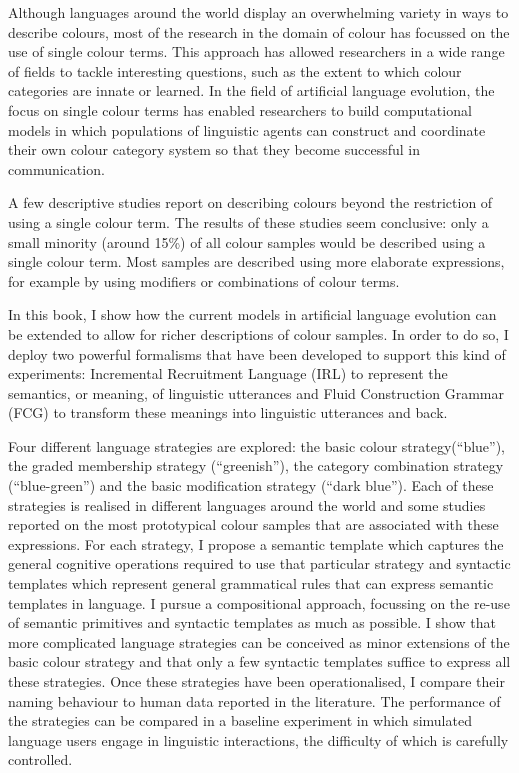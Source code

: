 
Although languages around the world display an overwhelming variety in
ways to describe colours, most of the research in the domain of colour
has focussed on the use of single colour terms. This approach has
allowed researchers in a wide range of fields to tackle interesting
questions, such as the extent to which colour categories are innate or
learned. In the field of artificial language evolution, the focus on
single colour terms has enabled researchers to build computational
models in which populations of linguistic agents can construct and
coordinate their own colour category system so that they become
successful in communication.

A few descriptive studies report on describing colours beyond the
restriction of using a single colour term. The results of these
studies seem conclusive: only a small minority (around 15\%) of all
colour samples would be described using a single colour term. Most
samples are described using more elaborate expressions, for example by
using modifiers or combinations of colour terms.

In this book, I show how the current models in artificial language
evolution can be extended to allow for richer descriptions of colour
samples. In order to do so, I deploy two powerful formalisms that have
been developed to support this kind of experiments: Incremental
Recruitment Language (IRL) to represent the semantics, or meaning, of
linguistic utterances and Fluid Construction Grammar (FCG) to
transform these meanings into linguistic utterances and back.

Four different language strategies are explored: the basic colour
strategy\linebreak (``blue''), the graded membership strategy (``greenish''),
the category combination strategy (``blue-green'') and the basic
modification strategy (``dark blue''). Each of these strategies is
realised in different languages around the world and some studies
reported on the most prototypical colour samples that are associated
with these expressions. For each strategy, I propose a semantic
template which captures the general cognitive operations required to
use that particular strategy and syntactic templates which represent
general grammatical rules that can express semantic templates in
language. I pursue a compositional approach, focussing on the re-use
of semantic primitives and syntactic templates as much as possible. I
show that more complicated language strategies can be conceived as
minor extensions of the basic colour strategy and that only a few
syntactic templates suffice to express all these strategies. Once
these strategies have been operationalised, I compare their naming
behaviour to human data reported in the literature. The performance of the
strategies can be compared in a baseline experiment in which simulated
language users engage in linguistic interactions, the
difficulty of which is carefully controlled.

